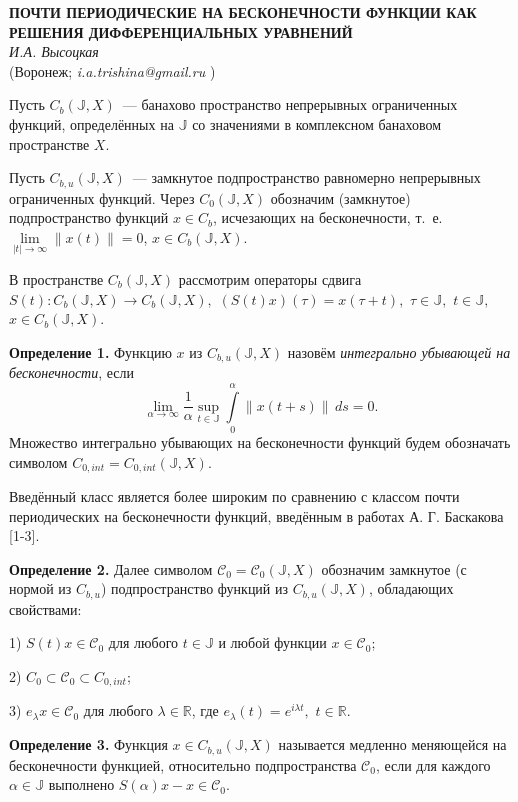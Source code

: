 \begin{center}{ \bf ПОЧТИ ПЕРИОДИЧЕСКИЕ НА БЕСКОНЕЧНОСТИ ФУНКЦИИ КАК РЕШЕНИЯ ДИФФЕРЕНЦИАЛЬНЫХ УРАВНЕНИЙ}\\
{\it И.А. Высоцкая } \\
(Воронеж; {\it i.a.trishina@gmail.ru} )
\end{center}

Пусть $C_b(\mathbb{J},X)$~--- банахово пространство непрерывных ограниченных функций,
определённых на $\mathbb{J}$ со значениями в комплексном банаховом пространстве $X$.

Пусть $C_{b,u}(\mathbb{J},X)$~--- замкнутое подпространство равномерно непрерывных ограниченных функций. Через $C_0(\mathbb{J},X)$ обозначим (замкнутое) подпространство функций $x\in C_b$,
 исчезающих на бесконечности, т.~е. $\lim\limits_{|t|\rightarrow\infty}\|x(t)\|=0$, $x\in C_b(\mathbb{J},X)$.

В пространстве $C_{b}(\mathbb{J},X)$ рассмотрим операторы сдвига $S(t):C_{b}(\mathbb{J},X)\rightarrow C_{b}(\mathbb{J},X),$ $(S(t)x)(\tau) = x(\tau + t),$ $\tau\in\mathbb{J},$ $t\in\mathbb{J},$ $x\in C_{b}(\mathbb{J},X)$.


\textbf{Определение 1.} Функцию  $x$ из $C_{b,u}(\mathbb{J},X)$ назовём \emph{интегрально убывающей на бесконечности},
если $$\lim\limits_{\alpha\rightarrow\infty}\frac{1}{\alpha}\sup\limits_{t\in\mathbb{J}}\int\limits_0^{\alpha}\|x(t+s)\|\,ds=0.$$
Множество интегрально убывающих на бесконечности фун\-к\-ций будем обозначать символом $C_{0,int}=C_{0,int}(\mathbb{J},X)$.

Введённый класс является более широким по сравнению с
классом почти периодических на бесконечности функций, введённым в работах А. Г.
Баскакова [1-3].

\textbf{Определение 2.} Далее символом $\mathcal{C}_0=\mathcal{C}_0(\mathbb{J},X)$ обозначим замкнутое (с нормой из $C_{b,u}$) подпространство функций из $C_{b,u}(\mathbb{J},X)$, обладающих свойствами:

1) $S(t)x\in \mathcal{C}_0$ для любого $t\in\mathbb{J}$ и любой функции $x\in\mathcal{C}_0$;

2) $C_0 \subset \mathcal{C}_0 \subset C_{0,int}$;

3) $e_{\lambda}x \in \mathcal{C}_0$ для любого $\lambda\in\mathbb{R}$, где $e_{\lambda}(t)=e^{i\lambda t},$ $t\in\mathbb{R}$.


\textbf{Определение 3.}
Функция $x\in C_{b,u}(\mathbb{J},X)$ называется медленно
меняющейся на бесконечности функцией, относительно подпространства $\mathcal{C}_0$, если для каждого $\alpha \in \mathbb{J}$ выполнено $S(\alpha)x-x\in \mathcal{C}_{0}$.



